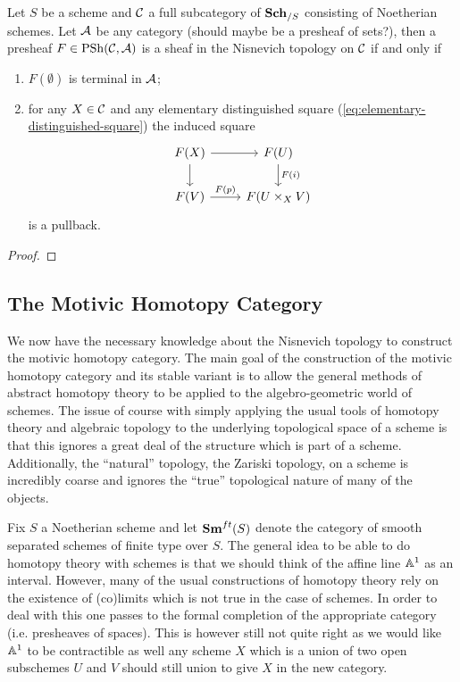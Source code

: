 \documentclass[12pt]{article}
\numberwithin{equation}{section}
\numberwithin{lemma}{section}
\numberwithin{theorem}{section}
\numberwithin{proposition}{section}
\numberwithin{corollary}{section}
\numberwithin{definition}{section}
\numberwithin{example}{section}
\numberwithin{remark}{section}
\begin{document}
\begin{theorem}\label{thm:descent}
  Let $S$ be a scheme and $\CC$ a full subcategory of $\Sch_{/S}$
  consisting of Noetherian schemes. Let $\AA$ be any category (should
  maybe be a presheaf of sets?), then a presheaf
  $F \in \PSh(\CC, \AA)$ is a sheaf in the Nisnevich topology on $\CC$
  if and only if
  \begin{enumerate}[label=(\arabic*)]
  \item $F(\emptyset)$ is terminal in $\AA$;
  \item for any $X \in \CC$ and any elementary distinguished square
    (\eqref{eq:elementary-distinguished-square}) the induced square
    \begin{equation*}
      \begin{tikzcd}
        F(X) \arrow[d] \arrow[r] & F(U) \arrow[d, "F(i)"] \\
        F(V) \arrow[r, "F(p)"] & F(U \times_X V)
      \end{tikzcd}
    \end{equation*}
    is a pullback.
  \end{enumerate}
\end{theorem}

\begin{proof}
\end{proof}

\subsection{The Motivic Homotopy Category}

We now have the necessary knowledge about the Nisnevich topology to
construct the motivic homotopy category. The main goal of the
construction of the motivic homotopy category and its stable variant
is to allow the general methods of abstract homotopy theory to be
applied to the algebro-geometric world of schemes. The issue of course
with simply applying the usual tools of homotopy theory and algebraic
topology to the underlying topological space of a scheme is that this
ignores a great deal of the structure which is part of a
scheme. Additionally, the ``natural'' topology, the Zariski topology,
on a scheme is incredibly coarse and ignores the ``true'' topological
nature of many of the objects.

Fix $S$ a Noetherian scheme and let $\Sm^{ft}(S)$ denote the category
of smooth separated schemes of finite type over $S$. The general idea
to be able to do homotopy theory with schemes is that we should think
of the affine line $\A^1$ as an interval. However, many of the usual
constructions of homotopy theory rely on the existence of (co)limits
which is not true in the case of schemes. In order to deal with this
one passes to the formal completion of the appropriate category
(i.e. presheaves of spaces). This is however still not quite right as
we would like $\A^1$ to be contractible as well any scheme $X$ which
is a union of two open subschemes $U$ and $V$ should still union to
give $X$ in the new category.
\end{document}
